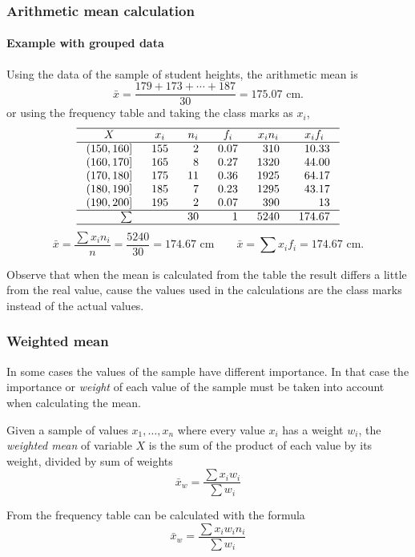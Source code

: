 \begin{frame}
\frametitle{Arithmetic mean calculation}
\framesubtitle{Example with grouped data}
Using the data of the sample of student heights, the arithmetic mean is 
\[
\bar{x} = \frac{179+173+\cdots+187}{30} = 175.07 \mbox{ cm}.
\]
or using the frequency table and taking the class marks as $x_i$,
\[
\setlength\arraycolsep{3mm}
\setlength\arrayrulewidth{0.5pt}
\begin{array}{rrrrrr}
\hline
\multicolumn{1}{c}{X} & \multicolumn{1}{c}{x_i} & \multicolumn{1}{c}{n_i} & \multicolumn{1}{c}{f_i} & \multicolumn{1}{c}{x_in_i} & \multicolumn{1}{c}{x_if_i}\\
\hline
(150,160] & 155 & 2 & 0.07 & 310 & 10.33\\
(160,170] & 165 & 8 & 0.27 & 1320 & 44.00\\
(170,180] & 175 & 11 & 0.36 & 1925 & 64.17\\
(180,190] & 185 & 7 & 0.23 & 1295 & 43.17\\
(190,200] & 195 & 2 & 0.07 & 390 & 13 \\
\hline
\sum &  & 30 & 1 & 5240 & 174.67 \\
\hline
\end{array}
\]
\[
\bar{x} = \frac{\sum x_in_i}{n} = \frac{5240}{30}= 174.67 \mbox{ cm}\qquad \bar{x}=\sum{x_if_i} = 174.67 \mbox{ cm}.
\]

Observe that when the mean is calculated from the table the result differs a little from the real value, cause the
values used in the calculations are the class marks instead of the actual values.
\end{frame}


\begin{frame}
\frametitle{Weighted mean}
In some cases the values of the sample have different importance. 
In that case the importance or \emph{weight} of each value of the sample must be taken into account when calculating
the mean. 

\begin{definition}
Given a sample of values $x_1,\ldots,x_n$ where every value $x_i$ has a weight $w_i$, the \emph{weighted
mean} of variable $X$ is the sum of the product of each value by its weight, divided by sum of weights
\[
\bar{x}_w = \frac{\sum x_iw_i}{\sum w_i}
\]
\end{definition}

From the frequency table can be calculated with the formula
\[
\bar{x}_w = \frac{\sum x_iw_in_i}{\sum w_i}
\]
\end{frame}


